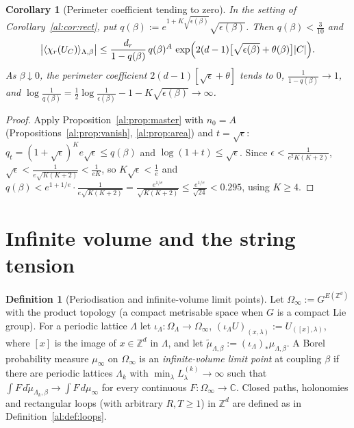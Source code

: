 \documentclass[11pt,a4paper]{article}
\newtheorem{corollary}[theorem]{Corollary}
\theoremstyle{definition}
\newtheorem{definition}[theorem]{Definition}
\theoremstyle{remark}
\newcommand{\C}{\mathbb{C}}
\newcommand{\Z}{\mathbb{Z}}
\begin{document}
\begin{corollary}[Perimeter coefficient tending to zero]\label{al:cor:smallkappa}
In the setting of Corollary~\ref{al:cor:rect}, put $q(\beta):=e^{1+K\sqrt{\epsilon(\beta)}}\sqrt{\epsilon(\beta)}$. Then
$q(\beta)<\frac3{10}$ and
\[
\bigl|\langle\chi_r(U_C)\rangle_{\Lambda,\beta}\bigr|\le\frac{d_r}{1-q(\beta)}\,q(\beta)^A\,
\exp\Bigl(2(d-1)\bigl[\sqrt{\epsilon(\beta)}+\theta(\beta)\bigr]|C|\Bigr).
\]
As $\beta\downarrow0$, the perimeter coefficient $2(d-1)[\sqrt{\epsilon}+\theta]$ tends to $0$, $\frac1{1-q(\beta)}\to1$, and
$\log\frac1{q(\beta)}=\frac12\log\frac1{\epsilon(\beta)}-1-K\sqrt{\epsilon(\beta)}\to\infty$.
\end{corollary}

\begin{proof}
Apply Proposition~\ref{al:prop:master} with $n_0=A$ (Propositions~\ref{al:prop:vanish}, \ref{al:prop:area}) and
$t=\sqrt\epsilon$: $q_t=(1+\sqrt\epsilon)^Ke\sqrt\epsilon\le q(\beta)$ and $\log(1+t)\le\sqrt\epsilon$. Since
$\epsilon<\frac1{e^2K(K+2)}$, $\sqrt\epsilon<\frac1{e\sqrt{K(K+2)}}<\frac1{eK}$, so $K\sqrt\epsilon<\frac1e$ and
$q(\beta)<e^{1+1/e}\cdot\frac1{e\sqrt{K(K+2)}}=\frac{e^{1/e}}{\sqrt{K(K+2)}}\le\frac{e^{1/e}}{\sqrt{24}}<0.295$, using
$K\ge4$.
\end{proof}

\section{Infinite volume and the string tension}\label{al:sec:infinite}

\begin{definition}[Periodisation and infinite-volume limit points]\label{al:def:limitpoints}
Let $\Omega_\infty:=G^{E(\Z^d)}$ with the product topology (a compact metrisable space when $G$ is a compact Lie group).
For a periodic lattice $\Lambda$ let $\iota_\Lambda:\Omega_\Lambda\to\Omega_\infty$, $(\iota_\Lambda U)_{(x,\lambda)}:=U_{([x],\lambda)}$,
where $[x]$ is the image of $x\in\Z^d$ in $\Lambda$, and let $\tilde\mu_{\Lambda,\beta}:=(\iota_\Lambda)_*\mu_{\Lambda,\beta}$. A
Borel probability measure $\mu_\infty$ on $\Omega_\infty$ is an \emph{infinite-volume limit point} at coupling $\beta$ if
there are periodic lattices $\Lambda_k$ with $\min_\lambda L^{(k)}_\lambda\to\infty$ such that
$\int F\,d\tilde\mu_{\Lambda_k,\beta}\to\int F\,d\mu_\infty$ for every continuous $F:\Omega_\infty\to\C$. Closed paths,
holonomies and rectangular loops (with arbitrary $R,T\ge1$) in $\Z^d$ are defined as in Definition~\ref{al:def:loops}.
\end{definition}
\end{document}
